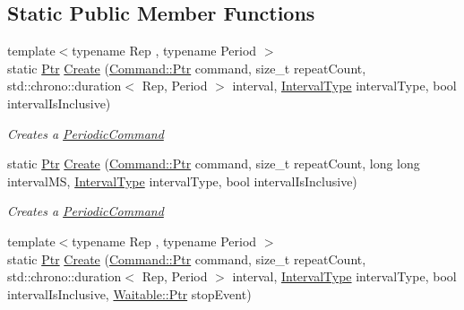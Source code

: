 \subsection*{Static Public Member Functions}
\begin{DoxyCompactItemize}
\item 
{\footnotesize template$<$typename Rep , typename Period $>$ }\\static \mbox{\hyperlink{class_command_lib_1_1_command_a3b3e4f00144373299df5c6bb1acc319d}{Ptr}} \mbox{\hyperlink{class_command_lib_1_1_periodic_command_aa553fa62e0e5774b39c1105caf3dd087}{Create}} (\mbox{\hyperlink{class_command_lib_1_1_command_a3b3e4f00144373299df5c6bb1acc319d}{Command\+::\+Ptr}} command, size\+\_\+t repeat\+Count, std\+::chrono\+::duration$<$ Rep, Period $>$ interval, \mbox{\hyperlink{class_command_lib_1_1_periodic_command_ac32ef93cf679cd652da30a0ad373d31e}{Interval\+Type}} interval\+Type, bool interval\+Is\+Inclusive)
\begin{DoxyCompactList}\small\item\em Creates a \mbox{\hyperlink{class_command_lib_1_1_periodic_command}{Periodic\+Command}} \end{DoxyCompactList}\item 
static \mbox{\hyperlink{class_command_lib_1_1_command_a3b3e4f00144373299df5c6bb1acc319d}{Ptr}} \mbox{\hyperlink{class_command_lib_1_1_periodic_command_aa6ae89b0c0a0a61388748856074596b8}{Create}} (\mbox{\hyperlink{class_command_lib_1_1_command_a3b3e4f00144373299df5c6bb1acc319d}{Command\+::\+Ptr}} command, size\+\_\+t repeat\+Count, long long interval\+MS, \mbox{\hyperlink{class_command_lib_1_1_periodic_command_ac32ef93cf679cd652da30a0ad373d31e}{Interval\+Type}} interval\+Type, bool interval\+Is\+Inclusive)
\begin{DoxyCompactList}\small\item\em Creates a \mbox{\hyperlink{class_command_lib_1_1_periodic_command}{Periodic\+Command}} \end{DoxyCompactList}\item 
{\footnotesize template$<$typename Rep , typename Period $>$ }\\static \mbox{\hyperlink{class_command_lib_1_1_command_a3b3e4f00144373299df5c6bb1acc319d}{Ptr}} \mbox{\hyperlink{class_command_lib_1_1_periodic_command_a22783c7b42c443ebe6a6392d380efe51}{Create}} (\mbox{\hyperlink{class_command_lib_1_1_command_a3b3e4f00144373299df5c6bb1acc319d}{Command\+::\+Ptr}} command, size\+\_\+t repeat\+Count, std\+::chrono\+::duration$<$ Rep, Period $>$ interval, \mbox{\hyperlink{class_command_lib_1_1_periodic_command_ac32ef93cf679cd652da30a0ad373d31e}{Interval\+Type}} interval\+Type, bool interval\+Is\+Inclusive, \mbox{\hyperlink{class_command_lib_1_1_waitable_ac74b6b91e48220146eada76a31cf2d9b}{Waitable\+::\+Ptr}} stop\+Event)

\end{DoxyCompactItemize}
